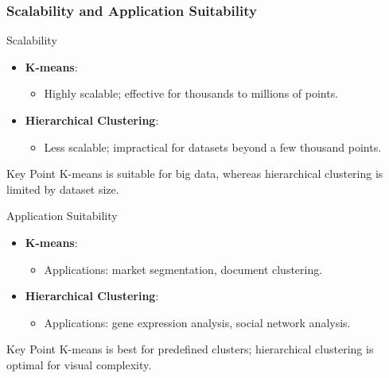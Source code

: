 \documentclass[aspectratio=169]{beamer}
\begin{document}
\begin{frame}[fragile]
    \frametitle{Scalability and Application Suitability}
    \begin{block}{Scalability}
        \begin{itemize}
            \item \textbf{K-means}:
            \begin{itemize}
                \item Highly scalable; effective for thousands to millions of points.
            \end{itemize}
            \item \textbf{Hierarchical Clustering}:
            \begin{itemize}
                \item Less scalable; impractical for datasets beyond a few thousand points.
            \end{itemize}
        \end{itemize}
        \begin{block}{Key Point}
            K-means is suitable for big data, whereas hierarchical clustering is limited by dataset size.
        \end{block}
    \end{block}
    
    \begin{block}{Application Suitability}
        \begin{itemize}
            \item \textbf{K-means}:
            \begin{itemize}
                \item Applications: market segmentation, document clustering.
            \end{itemize}
            \item \textbf{Hierarchical Clustering}:
            \begin{itemize}
                \item Applications: gene expression analysis, social network analysis.
            \end{itemize}
        \end{itemize}
        \begin{block}{Key Point}
            K-means is best for predefined clusters; hierarchical clustering is optimal for visual complexity.
        \end{block}
    \end{block}
\end{frame}
\end{document}
